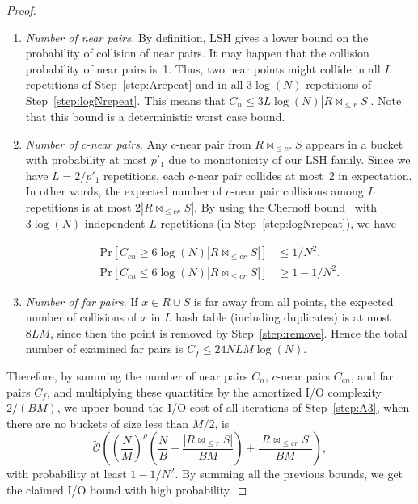 \documentclass{llncs}
\newcommand{\Osymbol}{{\mathcal O}}
\newcommand{\TO}[1]{\tilde{\Osymbol}\left(#1\right)}
\renewcommand{\Pr}[1]{\text{Pr}\left[#1\right]}
\begin{document}
\begin{proof}
\begin{enumerate}
\item \emph{Number of near pairs.} By definition, LSH gives a lower bound on the probability of collision of near pairs. 
It may happen that the collision probability of near pairs is~1. 
Thus, two near points might collide in all $L$ repetitions of
Step~\ref{step:Arepeat} and in all $3\log{(N)}$ repetitions of
Step~\ref{step:logNrepeat}. 
This means that $C_n \leq 3L\log{(N)}|R \bowtie_{\leq r} S|$. Note that this
bound is a deterministic worst case bound.

\item \emph{Number of $c$-near pairs}. Any $c$-near pair from $R \bowtie_{\leq cr} S$ appears in a bucket with probability at most $p'_1$ due to monotonicity of our LSH family. 
Since we have $L=2/p'_1$ repetitions, each $c$-near pair collides at most~2 in
expectation. 
In other words, the expected number of $c$-near pair collisions among $L$
repetitions is at most $2|R \bowtie_{\leq cr} S|$.
By using the Chernoff bound~\cite[Exercise 1.1]{PanconesiDubhashiBook} with
$3\log{(N)}$ independent $L$ repetitions (in Step~\ref{step:logNrepeat}), we
have 

\begin{displaymath}
\begin{aligned}
\Pr{C_{cn} \geq 6\log{(N)}|R \bowtie_{\leq cr} S| } &\leq 1/N^2, \\
\Pr{C_{cn} \leq 6\log{(N)}|R \bowtie_{\leq cr} S| } &\geq 1 - 1/N^2.
\end{aligned}
\end{displaymath}


\item \emph{Number of far pairs}. If $x \in R \cup S$ is far away from all
points, the expected number of collisions of $x$ in $L$ hash table (including
duplicates) is at most $8LM$, since then the point is removed by
Step~\ref{step:remove}.
Hence the total number of examined far pairs is $C_f \leq
24NLM\log{(N)}$.


\end{enumerate}
Therefore, by summing the number of near pairs $C_n$, $c$-near pairs $C_{cn}$, and far pairs $C_f$, and multiplying these quantities by the amortized I/O complexity $2/(BM)$, we upper bound the I/O cost of all iterations of Step~\ref{step:A3}, when there are no buckets of size less than $M/2$, is
$$
\TO{\left(\frac{N}{M}\right)^\rho \left(\frac{N}{B}+ \frac{|R \bowtie_{\leq r} S|}{BM}\right)+\frac{|R \bowtie_{\leq cr} S|}{BM}},
$$
with probability at least $1-1/N^2$.
By summing all the previous bounds, we get the claimed I/O bound with high probability.




\end{proof}
\end{document}
